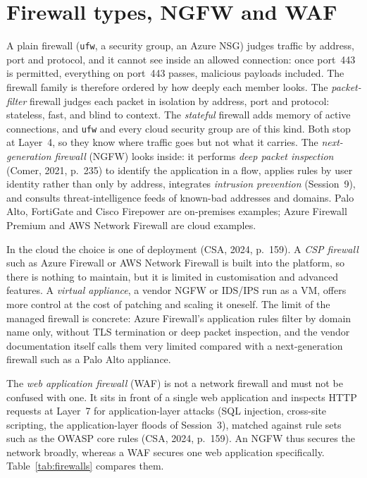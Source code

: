 \section{Firewall types, NGFW and WAF}

A plain firewall (\texttt{ufw}, a security group, an Azure NSG) judges
traffic by address, port and protocol, and it cannot see inside an allowed
connection: once port~443 is permitted, everything on port~443 passes,
malicious payloads included. The firewall family is therefore ordered by
how deeply each member looks. The \emph{packet-filter} firewall judges each
packet in isolation by address, port and protocol: stateless, fast, and
blind to context. The \emph{stateful} firewall adds memory of active
connections, and \texttt{ufw} and every cloud security group are of this
kind. Both stop at Layer~4, so they know where traffic goes but not what it
carries. The \emph{next-generation firewall} (NGFW) looks inside: it
performs \emph{deep packet inspection} (Comer, 2021, p.~235) to identify the
application in a flow, applies rules by user identity rather than only by
address, integrates \emph{intrusion prevention} (Session~9), and consults
threat-intelligence feeds of known-bad addresses and domains. Palo Alto,
FortiGate and Cisco Firepower are on-premises examples; Azure Firewall
Premium and AWS Network Firewall are cloud examples.

In the cloud the choice is one of deployment (CSA, 2024, p.~159). A
\emph{CSP firewall} such as Azure Firewall or AWS Network Firewall is built
into the platform, so there is nothing to maintain, but it is limited in
customisation and advanced features. A \emph{virtual appliance}, a vendor
NGFW or IDS/IPS run as a VM, offers more control at the cost of patching and
scaling it oneself. The limit of the managed firewall is concrete: Azure
Firewall's application rules filter by domain name only, without TLS
termination or deep packet inspection, and the vendor documentation itself
calls them very limited compared with a next-generation firewall such as a
Palo Alto appliance.

The \emph{web application firewall} (WAF) is not a network firewall and must
not be confused with one. It sits in front of a single web application and
inspects HTTP requests at Layer~7 for application-layer attacks (SQL
injection, cross-site scripting, the application-layer floods of
Session~3), matched against rule sets such as the OWASP core rules (CSA,
2024, p.~159). An NGFW thus secures the network broadly, whereas a WAF
secures one web application specifically. Table~\ref{tab:firewalls}
compares them.

